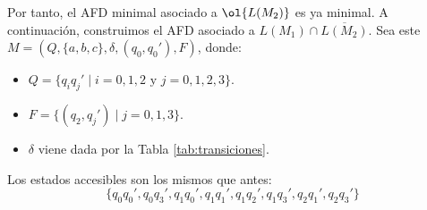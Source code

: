 \begin{ejercicio}
\begin{enumerate}
        Por tanto, el AFD minimal asociado a $\ol{L(M_2)}$ es ya minimal. A continuación, construimos el AFD asociado a $L(M_1)\cap \overline{L(M_2)}$. Sea este $M=(Q,\{a,b,c\},\delta,(q_0,q_0'),F)$, donde:
        \begin{itemize}
            \item $Q=\{q_iq_j'\mid i=0,1,2\text{ y }j=0,1,2,3\}$.
            \item $F=\{(q_2,q_j')\mid j=0,1,3\}$.
            \item $\delta$ viene dada por la Tabla \ref{tab:transiciones}.
        \end{itemize}

        Los estados accesibles son los mismos que antes:
        \begin{equation*}
            \{q_0q_0',q_0q_3',q_1q_0',q_1q_1',q_1q_2',q_1q_3',q_2q_1',q_2q_3'\}
        \end{equation*}


\end{enumerate}
\end{ejercicio}
